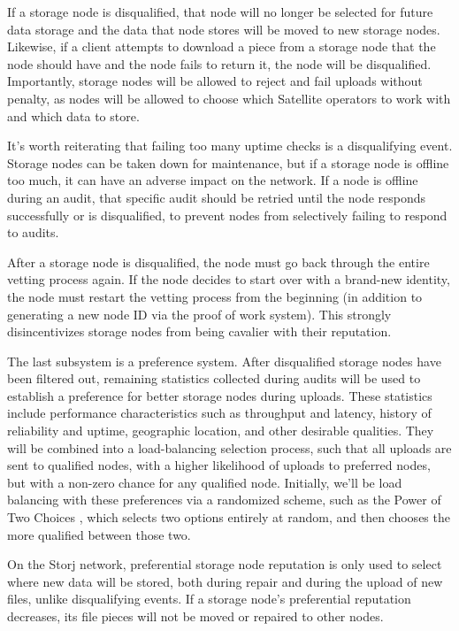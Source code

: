 \documentclass[8pt,fleqn,openany]{book}
\begin{document}
If a storage node is disqualified, that node will no longer be selected for
future data storage and the data that node stores will be moved to new
storage nodes.
Likewise, if a client attempts to download a piece from a storage node that
the node should have and the node fails to return it, the
node will be disqualified. Importantly, storage nodes will be allowed to reject
and fail uploads without penalty, as nodes will be allowed to choose which
Satellite operators to work with and which data to store.

It's worth reiterating that failing too many uptime checks is a disqualifying
event. Storage nodes can be taken down for maintenance, but if a storage node
is offline too much, it can have an adverse impact on the network. If a node
is offline during an audit, that specific audit should be retried until the node
responds successfully or is disqualified, to prevent nodes from selectively
failing to respond to audits.

After a storage node is disqualified, the node must go back through the entire
vetting process again. If the node decides to start over with a brand-new
identity, the node must restart the vetting process from the beginning (in
addition to generating a new node ID via the proof of work system). This
strongly disincentivizes storage nodes from being cavalier with their
reputation.

The last subsystem is a preference system. After disqualified storage nodes
have been filtered out, remaining statistics collected during audits
will be used to establish a preference for better storage nodes during uploads.
These statistics include performance characteristics such as throughput and
latency, history of reliability and uptime, geographic location, and other
desirable qualities.
They will be combined into a load-balancing selection process, such
that all uploads are sent to qualified nodes, with a higher likelihood of
uploads to preferred nodes, but with a non-zero chance for any qualified node.
Initially, we'll be load balancing with these preferences via a randomized
scheme, such as the Power of Two Choices \cite{power-of-two-choices}, which
selects two options entirely at random, and then chooses the more qualified
between those two.

On the Storj network, preferential storage node reputation is only used to
select where new data will be stored, both during repair and during the
upload of new files, unlike disqualifying events.
If a storage node's preferential reputation decreases, its file pieces will not
be moved or repaired to other nodes.
\end{document}
